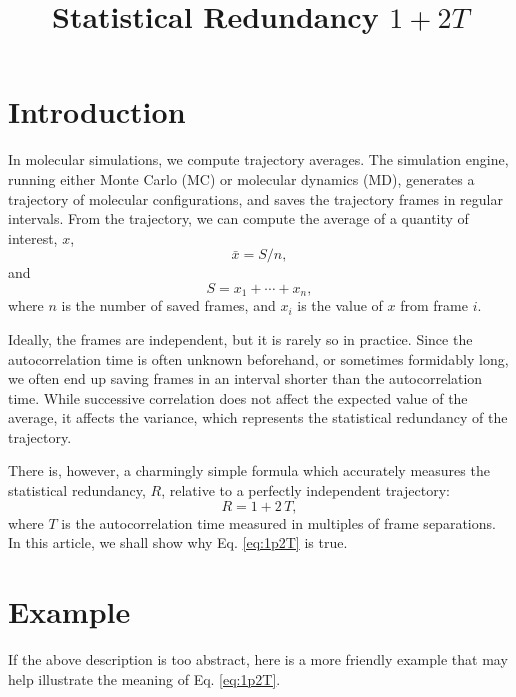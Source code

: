 \documentclass[12pt]{article}
\begin{document}
\title{Statistical Redundancy $1 + 2T$}
\author{}
\date{\vspace{-10ex}}
\maketitle


\section{Introduction}


In molecular simulations, we compute trajectory averages.
%
The simulation engine,
running either Monte Carlo (MC) or molecular dynamics (MD),
generates a trajectory of molecular configurations,
and saves the trajectory frames in regular intervals.
%
From the trajectory,
we can compute the average of a quantity of interest, $x$,
%
\begin{equation}
  \bar x = S / n,
  \label{eq:xbar}
\end{equation}
%
and
%
\begin{equation}
  S = x_1 + \cdots + x_n,
  \label{eq:sumx}
\end{equation}
%
where $n$ is the number of saved frames,
and $x_i$ is the value of $x$ from frame $i$.

Ideally, the frames are independent,
but it is rarely so in practice.
%
Since the autocorrelation time is often unknown beforehand,
or sometimes formidably long,
we often end up saving frames in an interval shorter than
the autocorrelation time.
%
While successive correlation does not affect the expected value
of the average, it affects the variance, which represents
the statistical redundancy of the trajectory.

There is, however, a charmingly simple formula
which accurately measures the statistical redundancy, $R$,
relative to a perfectly independent trajectory:
%
\begin{equation}
  R = 1 + 2 \, T,
  \label{eq:1p2T}
\end{equation}
%
where $T$ is the autocorrelation time measured
in multiples of frame separations.
%
In this article, we shall show why Eq. \eqref{eq:1p2T} is true.


\section{Example}


If the above description is too abstract,
here is a more friendly example that may help illustrate
the meaning of Eq. \eqref{eq:1p2T}.
\end{document}
